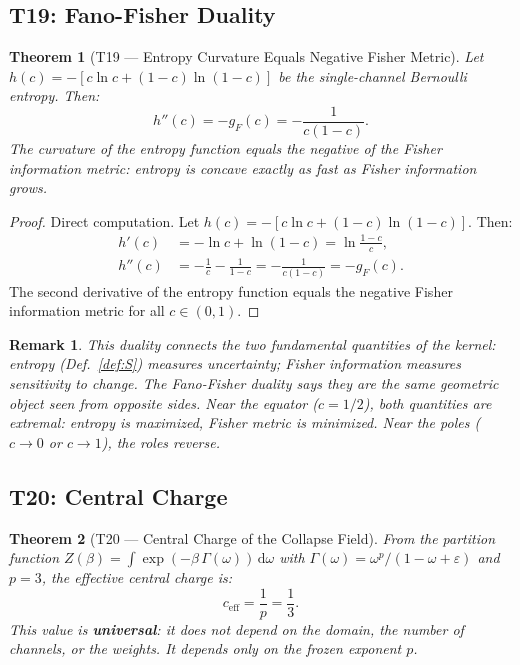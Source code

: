 \documentclass[
  aps,
  prd,
  preprint,
  superscriptaddress,
  nofootinbib,
  floatfix,
  longbibliography
]{revtex4-2}
\newtheorem{theorem}{Theorem}
\newtheorem{remark}{Remark}
\newcommand{\Gam}{\Gamma}
\newcommand{\eps}{\varepsilon}
\newcommand{\dd}{\mathrm{d}}
\newcommand{\beq}{\begin{equation}}
\newcommand{\eeq}{\end{equation}}
\newcommand{\Drft}{\omega}
\newcommand{\ceff}{c_{\mathrm{eff}}}
\newcommand{\gFisher}{g_{\!F}}
\begin{document}
\subsection{T19: Fano-Fisher Duality}

\begin{theorem}[T19 — Entropy Curvature Equals Negative Fisher Metric]\label{thm:T19}
Let $h(c) = -[c\ln c + (1-c)\ln(1-c)]$ be the single-channel
Bernoulli entropy. Then:
\beq
  h''(c) = -\gFisher(c) = -\frac{1}{c(1-c)}.
\eeq
The curvature of the entropy function equals the negative
of the Fisher information metric: entropy is concave
\emph{exactly} as fast as Fisher information grows.
\end{theorem}

\begin{proof}[Proof]
Direct computation.
Let $h(c) = -[c\ln c + (1-c)\ln(1-c)]$.
Then:
\begin{align}
  h'(c) &= -\ln c + \ln(1-c)
    = \ln\!\frac{1-c}{c}, \nonumber\\
  h''(c) &= -\frac{1}{c} - \frac{1}{1-c}
    = -\frac{1}{c(1-c)} = -\gFisher(c).
\end{align}
The second derivative of the entropy function
equals the negative Fisher information metric
for all $c \in (0,1)$.
\end{proof}

\begin{remark}
This duality connects the two fundamental quantities of the
kernel: entropy (Def.~\ref{def:S}) measures uncertainty;
Fisher information measures sensitivity to change.
The Fano-Fisher duality says they are the \emph{same}
geometric object seen from opposite sides.
Near the equator ($c = 1/2$), both quantities are
extremal: entropy is maximized, Fisher metric is minimized.
Near the poles ($c \to 0$ or $c \to 1$),
the roles reverse.
\end{remark}

\subsection{T20: Central Charge}

\begin{theorem}[T20 — Central Charge of the Collapse Field]\label{thm:T20}
From the partition function
$Z(\beta) = \int \exp(-\beta\,\Gam(\Drft))\,\dd\Drft$
with $\Gam(\Drft) = \Drft^p/(1-\Drft+\eps)$ and $p=3$,
the effective central charge is:
\beq
  \ceff = \frac{1}{p} = \frac{1}{3}.
\eeq
This value is \textbf{universal}: it does not depend on
the domain, the number of channels, or the weights.
It depends only on the frozen exponent $p$.
\end{theorem}
\end{document}
